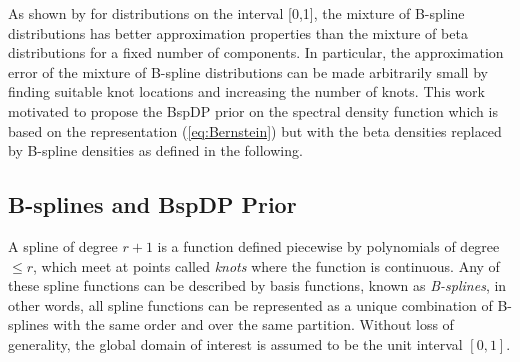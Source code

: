 \documentclass[twocolumn,final]{svjour3}
\begin{document}
As shown by \cite{Perron:2001} for distributions on the interval [0,1], the mixture of B-spline distributions has better approximation properties than the mixture of beta distributions for a fixed number of components. In particular, the approximation error of the mixture of B-spline distributions 
can be made arbitrarily small by finding  suitable knot locations and increasing the number of knots.
This work motivated \cite{Edwards2019} to propose the BspDP prior on the spectral density function which is based on the representation (\ref{eq:Bernstein}) but with
the beta densities replaced by B-spline densities as defined in the following.

\subsection*{B-splines and BspDP Prior}

A spline of degree $r+1$ is a function defined piecewise by polynomials of degree $\leq r$, which meet at points called \textit{knots} where the function is continuous.  Any of these spline functions can be described by basis functions, known as \textit{B-splines}, in other words, all spline functions can be represented as a unique combination of B-splines with the same order and over the same partition.  Without loss of generality, the global domain of interest is assumed to be the unit interval $[0,1]$.
\end{document}
